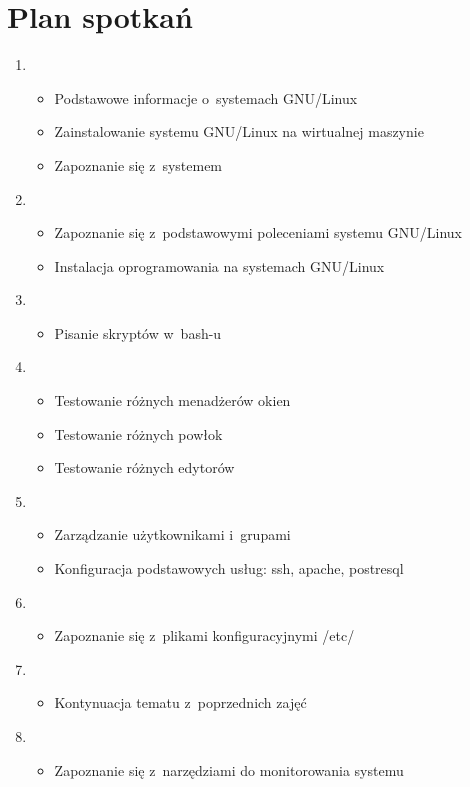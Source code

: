 \documentclass[a4paper,12pt]{article}
\begin{document}
\section{Plan spotkań}
\begin{enumerate}
\item \begin{itemize}
		\item Podstawowe informacje o~systemach GNU/Linux
		\item Zainstalowanie systemu GNU/Linux na wirtualnej maszynie
		\item Zapoznanie się z~systemem
	\end{itemize}
\item \begin{itemize}
		\item Zapoznanie się z~podstawowymi poleceniami systemu GNU/Linux
		\item Instalacja oprogramowania na systemach GNU/Linux
	\end{itemize}
\item \begin{itemize}
		\item Pisanie skryptów w~bash-u
	\end{itemize}
\item \begin{itemize}
		\item Testowanie różnych menadżerów okien
		\item Testowanie różnych powłok
		\item Testowanie różnych edytorów
	\end{itemize}
\item \begin{itemize}
		\item Zarządzanie użytkownikami i~grupami
		\item Konfiguracja podstawowych usług: ssh, apache, postresql
	\end{itemize}
\item \begin{itemize}
		\item Zapoznanie się z~plikami konfiguracyjnymi /etc/
	\end{itemize}
\item \begin{itemize}
		\item Kontynuacja tematu z~poprzednich zajęć
	\end{itemize}
\item \begin{itemize}
		\item Zapoznanie się z~narzędziami do monitorowania systemu

\end{itemize}
\end{enumerate}
\end{document}
